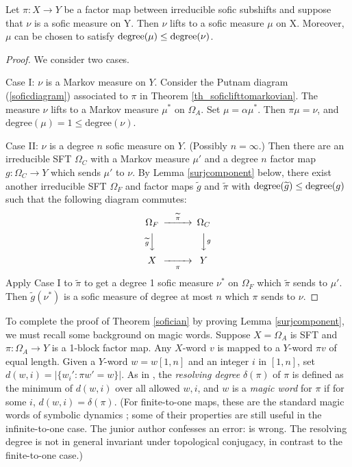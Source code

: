 \documentclass{kepart2010}
\theoremstyle{plain}
\theoremstyle{definition}
\theoremstyle{remark}
\theoremstyle{definition}
\numberwithin{equation}{section}
\begin{document}
\begin{thm}\label{sofician}
Let  $\pi: X \to Y$ be a factor map between irreducible
 sofic subshifts and suppose that $\nu$
is a sofic  measure on Y.
Then $\nu$ lifts to a sofic
measure $\mu$ on X. Moreover, $\mu$ can be chosen to satisfy
$\textnormal{degree}(\mu ) \leq \textnormal{degree}(\nu )$.
\end{thm}
\begin{proof}
We consider two cases.

Case I: $\nu$ is a Markov measure on $Y$.
Consider the
Putnam diagram (\ref{soficdiagram}) associated to $\pi$ in
Theorem \ref{th_soficlifttomarkovian}.
The measure $\nu$ lifts to a Markov measure $\mu^*$ on
$\Omega_A$.
Set $\mu = \alpha \mu^*$.
Then $\pi \mu = \nu$, and
$\text{degree}(\mu )= 1 \leq
\text{degree}(\nu )$.

Case II: $\nu$ is a degree $n$ sofic measure on $Y$. (Possibly
$n=\infty$.) Then there are an irreducible SFT
 $\Omega_C$ with a Markov measure
$\mu'$ and a degree $n$ factor map $g: \Omega_C \to Y$ which sends
$\mu'$ to $\nu$. By Lemma  \ref{surjcomponent}
 below,
there exist another irreducible SFT $\Omega_F$ and factor maps
$\widetilde g$ and $\widetilde{\pi}$ with
 $\textnormal{degree}(\widetilde g) \leq
\textnormal{degree}(g)$ such that the following diagram commutes:
 \begin{equation}
 \begin{CD}
\Omega_F & @>\ \widetilde{\pi}\ >> & \Omega_C \\
 @V \widetilde g VV & & @VV g V\\
X & @>>\ \pi \ > & Y
 \end{CD}
 \end{equation}
Apply Case I to
$\widetilde{\pi}$ to get a degree 1 sofic measure $\nu^*$ on
$\Omega_F $
which $\widetilde{\pi}$ sends to $\mu'$. Then
$\widetilde g(\nu^*)$ is a sofic
measure of  degree at most
$n$  which $\pi$ sends to $\nu$.
\end{proof}

To complete the proof of Theorem \ref{sofician} by proving Lemma
\ref{surjcomponent}, we must recall some background on magic words.
Suppose
$X=\Omega_A$ is SFT and $\pi :\Omega_A\to Y$ is a 1-block factor
map. Any $X$-word $v$ is mapped to a $Y$-word $\pi v$ of equal
length. Given
{ a $Y$-word $w=w[1,n]$}
 and an integer $i$ in
$[1,n]$, set $d(w,i) = |\{w_i': \pi w' =w\}|$. As in
\cite{Boyle2005}, the {\em resolving degree} $\delta (\pi )$ of
$\pi$ is defined as the minimum of $d(w,i)$ over all allowed $w,i$,
and $w$ is a {\em magic word} for $\pi$ if for some $i$,
$d(w,i)=\delta (\pi )$. (For finite-to-one maps, these are the
standard magic words of symbolic dynamics
\cite{LindMarcus1995,Kitchens1998}; some of their properties are
still useful in the infinite-to-one case. The junior author
confesses  an error: \cite[Theorem 7.1]{Boyle2005} is wrong. The
resolving degree is not in general invariant under topological
conjugacy, in contrast to the finite-to-one case.)
\end{document}
